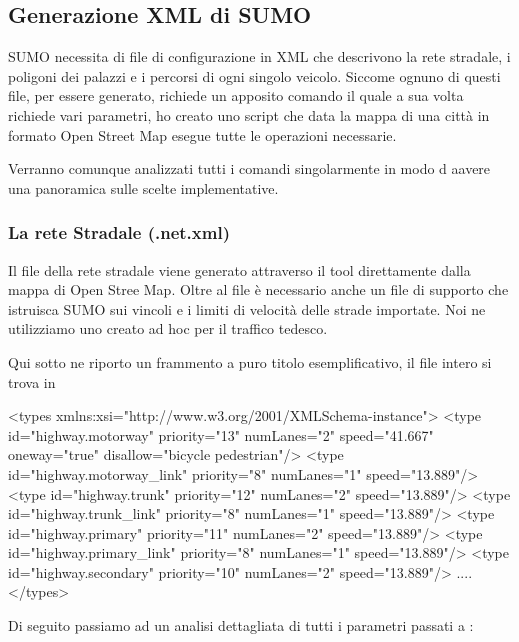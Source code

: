 \subsection{Generazione XML di SUMO}

SUMO necessita di file di configurazione in XML che descrivono la rete stradale, i poligoni dei palazzi e i percorsi di ogni singolo veicolo. Siccome ognuno di questi file, per essere generato, richiede un apposito comando il quale a sua volta richiede vari parametri, ho creato uno script che data la mappa di una città in formato Open Street Map esegue tutte le operazioni necessarie.

Verranno comunque analizzati tutti i comandi singolarmente in modo d aavere una panoramica sulle scelte implementative.

\subsubsection{La rete Stradale (.net.xml)}

Il file della rete stradale viene generato attraverso il tool  direttamente dalla mappa di Open Stree Map. Oltre al file  è necessario anche un file di supporto che istruisca SUMO sui vincoli e i limiti di velocità delle strade importate. Noi ne utilizziamo uno creato ad hoc per il traffico tedesco. 

Qui sotto ne riporto un frammento a puro titolo esemplificativo, il file intero si trova in 

\begin{xml}
<types xmlns:xsi="http://www.w3.org/2001/XMLSchema-instance">
  <type id="highway.motorway" priority="13" numLanes="2" speed="41.667"
                oneway="true" disallow="bicycle pedestrian"/>
  <type id="highway.motorway_link" priority="8" numLanes="1" speed="13.889"/>
  <type id="highway.trunk" priority="12" numLanes="2" speed="13.889"/>
  <type id="highway.trunk_link" priority="8" numLanes="1" speed="13.889"/>
  <type id="highway.primary" priority="11" numLanes="2" speed="13.889"/>
  <type id="highway.primary_link" priority="8" numLanes="1" speed="13.889"/>
  <type id="highway.secondary" priority="10" numLanes="2" speed="13.889"/>
  ....
</types> 
\end{xml}

Di seguito passiamo ad un analisi dettagliata di tutti i parametri passati a :

